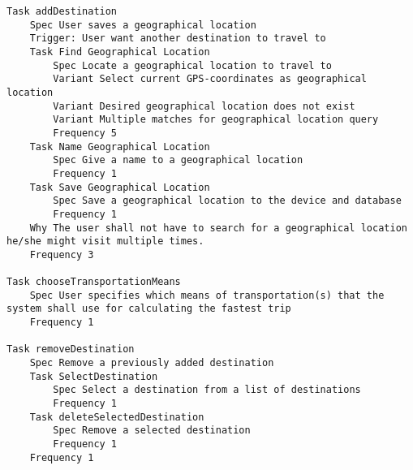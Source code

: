 

\begin{lstlisting}
Task addDestination
	Spec User saves a geographical location
	Trigger: User want another destination to travel to
	Task Find Geographical Location
		Spec Locate a geographical location to travel to
		Variant Select current GPS-coordinates as geographical location
		Variant Desired geographical location does not exist
		Variant Multiple matches for geographical location query
		Frequency 5
	Task Name Geographical Location
		Spec Give a name to a geographical location
		Frequency 1
	Task Save Geographical Location
		Spec Save a geographical location to the device and database
		Frequency 1
	Why The user shall not have to search for a geographical location he/she might visit multiple times.
	Frequency 3

Task chooseTransportationMeans
	Spec User specifies which means of transportation(s) that the system shall use for calculating the fastest trip
	Frequency 1

Task removeDestination
	Spec Remove a previously added destination
	Task SelectDestination
		Spec Select a destination from a list of destinations
		Frequency 1
	Task deleteSelectedDestination
		Spec Remove a selected destination
		Frequency 1
	Frequency 1

\end{lstlisting}
